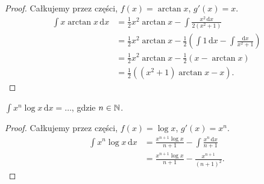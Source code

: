 \begin{proof}
    Całkujemy przez części, $f(x) = \arctan x$, $g'(x) = x$.
    \begin{align}
        \int x \arctan x \, \mathrm{d} x & = \frac 12 x^2 \arctan x - \int \frac{x^2 \,\mathrm{d}x}{2(x^2+1)} \\
                                         & = \frac 12 x^2 \arctan x - \frac 12 \left(\int 1 \,\mathrm{d}x - \int \frac{\mathrm{d}x}{x^2+1} \right) \\
                                         & = \frac 12 x^2 \arctan x - \frac 12 \left(x - \arctan x \right) \\
                                         & = \frac 12 \left((x^2+1)\arctan x - x \right).
    \end{align}
\end{proof}

\begin{integral}
    $\int x^n \log x \,\mathrm{d} x = \ldots$, gdzie $n \in \mathbb N$.
\end{integral}

\begin{proof}
    Całkujemy przez części, $f(x) = \log x$, $g'(x) = x^n$.
    \begin{align}
        \int x^n \log x \, \mathrm{d} x & = \frac{x^{n+1} \log x}{n+1} - \int \frac{x^n \,\mathrm{d} x}{n+1} \\
                                        & = \frac{x^{n+1} \log x}{n+1} - \frac{x^{n+1}}{(n+1)^2}.
    \end{align}
\end{proof}

%